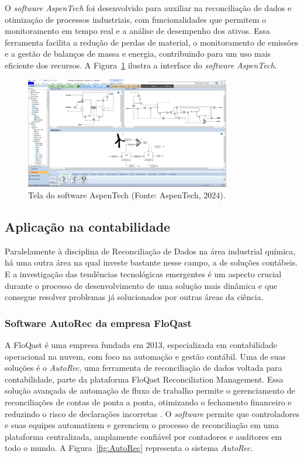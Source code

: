 O \textit{software} \textit{AspenTech} foi desenvolvido para auxiliar na reconciliação de dados e otimização de processos industriais, com funcionalidades que permitem o monitoramento em tempo real e a análise de desempenho dos ativos. Essa ferramenta facilita a redução de perdas de material, o monitoramento de emissões e a gestão de balanços de massa e energia, contribuindo para um uso mais eficiente dos recursos. A Figura~\ref{fig:AspenTech} ilustra a interface do \textit{software} \textit{AspenTech}.

\begin{figure}[htbp!]
	\centering
	\includegraphics[width=0.8\textwidth]{figuras/aspen-aspentech.png}
	\caption{Tela do software AspenTech (Fonte: AspenTech, 2024).}
	\label{fig:AspenTech}
\end{figure}

\subsection{Aplicação na contabilidade}

Paralelamente à disciplina de Reconciliação de Dados na área industrial química, há uma outra área na qual investe bastante nesse campo, a de soluções contábeis. E a investigação das tendências tecnológicas emergentes é um aspecto crucial durante o processo de desenvolvimento de uma solução mais dinâmica e que consegue resolver problemas já solucionados por outras áreas da ciência.

\subsubsection{Software AutoRec da empresa FloQast}

A FloQast é uma empresa fundada em 2013, especializada em contabilidade operacional na nuvem, com foco na automação e gestão contábil. Uma de suas soluções é o \textit{AutoRec}, uma ferramenta de reconciliação de dados voltada para contabilidade, parte da plataforma FloQast Reconciliation Management. Essa solução avançada de automação de fluxo de trabalho permite o gerenciamento de reconciliações de contas de ponta a ponta, otimizando o fechamento financeiro e reduzindo o risco de declarações incorretas \cite{floqast}. O \textit{software} permite que controladores e suas equipes automatizem e gerenciem o processo de reconciliação em uma plataforma centralizada, amplamente confiável por contadores e auditores em todo o mundo. A Figura~\ref{fig:AutoRec} representa o sistema \textit{AutoRec}.

